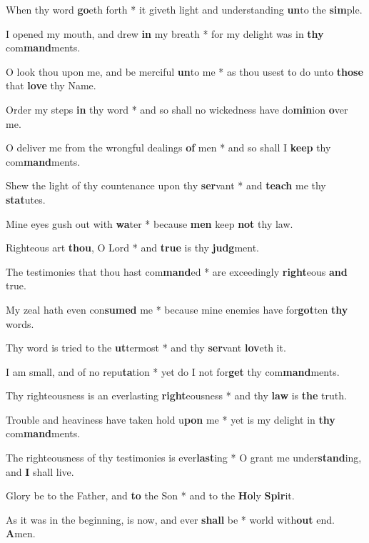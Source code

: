 \begin{multicols}{2}
	When thy word \textbf{go}eth forth * it giveth light and understanding \textbf{un}to the \textbf{sim}ple.
	
	I opened my mouth, and drew \textbf{in} my breath * for my delight was in \textbf{thy} com\textbf{mand}ments.
	
	O look thou upon me, and be merciful \textbf{un}to me * as thou usest to do unto \textbf{those} that \textbf{love} thy Name.
	
	Order my steps \textbf{in} thy word * and so shall no wickedness have do\textbf{min}ion \textbf{o}ver me.
	
	O deliver me from the wrongful dealings \textbf{of} men * and so shall I \textbf{keep} thy com\textbf{mand}ments.
	
	Shew the light of thy countenance upon thy \textbf{ser}vant * and \textbf{teach} me thy \textbf{stat}utes.
	
	Mine eyes gush out with \textbf{wa}ter * because \textbf{men} keep \textbf{not} thy law.
	
	Righteous art \textbf{thou}, O Lord * and \textbf{true} is thy \textbf{judg}ment.
	
	The testimonies that thou hast com\textbf{mand}ed * are exceedingly \textbf{right}eous \textbf{and} true.
	
	My zeal hath even con\textbf{sumed} me * because mine enemies have for\textbf{got}ten \textbf{thy} words.
	
	Thy word is tried to the \textbf{ut}termost * and thy \textbf{ser}vant \textbf{lov}eth it.
	
	I am small, and of no repu\textbf{ta}tion * yet do I not for\textbf{get} thy com\textbf{mand}ments.
	
	Thy righteousness is an everlasting \textbf{right}eousness * and thy \textbf{law} is \textbf{the} truth.
	
	Trouble and heaviness have taken hold u\textbf{pon} me * yet is my delight in \textbf{thy} com\textbf{mand}ments.
	
	The righteousness of thy testimonies is ever\textbf{last}ing * O grant me under\textbf{stand}ing, and \textbf{I} shall live.
	
	Glory be to the Father, and \textbf{to} the Son * and to the \textbf{Ho}ly \textbf{Spir}it.
	
	As it was in the beginning, is now, and ever \textbf{shall} be * world with\textbf{out} end. \textbf{A}men.
\end{multicols}